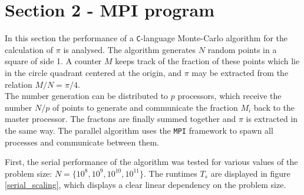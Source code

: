 \documentclass{article}
\begin{document}



\section{Section 2 - MPI program}

In this section the performance of a \verb|C|-language Monte-Carlo algorithm for the calculation of $\pi$ is analysed. The algorithm generates $N$ random points in a square of side 1. A counter $M$ keeps track of the fraction of these points which lie in the circle quadrant centered at the origin, and $\pi$ may be extracted from the relation $M/N = \pi /4$.\\
The number generation can be distributed to $p$ processors, which receive the number $N/p$ of points to generate and communicate the fraction $M_i$ back to the master processor. The fractons are finally summed together and $\pi$ is extracted in the same way. The parallel algorithm uses the \verb|MPI| framework to spawn all processes and communicate between them.
\par 
First, the serial performance of the algorithm was tested for various values of the problem size: $N=\{ 10^8 , 10^9 , 10^{10} , 10^{11} \} $. The runtimes $T_s$ are displayed in figure \ref{serial_scaling}, which displays a clear linear dependency on the problem size.
\end{document}
